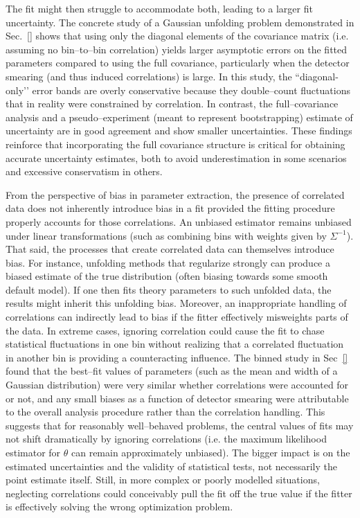     The fit might then struggle to accommodate both, leading to a larger fit uncertainty.
    The concrete study of a Gaussian unfolding problem demonstrated in Sec.~\ref{} shows that using only the diagonal elements of the covariance matrix (i.e. assuming no bin--to--bin correlation) yields larger asymptotic errors on the fitted parameters compared to using the full covariance, particularly when the detector smearing (and thus induced correlations) is large.
    In this study, the ``diagonal-only’’ error bands are overly conservative because they double--count fluctuations that in reality were constrained by correlation.
    In contrast, the full--covariance analysis and a pseudo--experiment (meant to represent bootstrapping) estimate of uncertainty are in good agreement and show smaller uncertainties.
    These findings reinforce that incorporating the full covariance structure is critical for obtaining accurate uncertainty estimates, both to avoid underestimation in some scenarios and excessive conservatism in others.

    From the perspective of bias in parameter extraction, the presence of correlated data does not inherently introduce bias in a fit provided the fitting procedure properly accounts for those correlations.
    An unbiased estimator remains unbiased under linear transformations (such as combining bins with weights given by $\Sigma^{-1}$).
    That said, the processes that create correlated data can themselves introduce bias.
    For instance, unfolding methods that regularize strongly can produce a biased estimate of the true distribution (often biasing towards some smooth default model).
    If one then fits theory parameters to such unfolded data, the results might inherit this unfolding bias.
    Moreover, an inappropriate handling of correlations can indirectly lead to bias if the fitter effectively misweights parts of the data.
    In extreme cases, ignoring correlation could cause the fit to chase statistical fluctuations in one bin without realizing that a correlated fluctuation in another bin is providing a counteracting influence.
    The binned study in Sec~\ref{} found that the best--fit values of parameters (such as the mean and width of a Gaussian distribution) were very similar whether correlations were accounted for or not, and any small biases as a function of detector smearing were attributable to the overall analysis procedure rather than the correlation handling.
    This suggests that for reasonably well--behaved problems, the central values of fits may not shift dramatically by ignoring correlations (i.e. the maximum likelihood estimator for $\theta$ can remain approximately unbiased).
    The bigger impact is on the estimated uncertainties and the validity of statistical tests, not necessarily the point estimate itself.
    Still, in more complex or poorly modelled situations, neglecting correlations could conceivably pull the fit off the true value if the fitter is effectively solving the wrong optimization problem.

